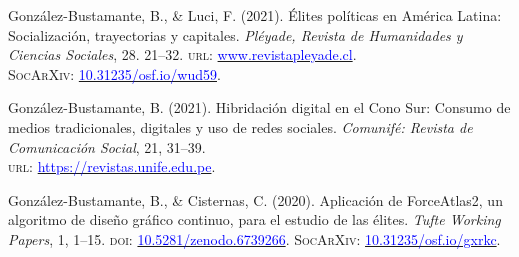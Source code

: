 \begin{publications}
\begin{benumerate}{14}
\item{González-Bustamante, B., \& Luci, F. (2021). Élites políticas en América Latina: Socialización, trayectorias y capitales. {\itshape Pléyade, Revista de Humanidades y Ciencias Sociales}, 28. 21--32. {\scshape url:} \href{http://www.revistapleyade.cl/index.php/OJS/article/view/359}{\textcolor{blue}{www.revistapleyade.cl}}. \\ {\scshape \footnotesize SocArXiv:} \href{https://doi.org/10.31235/osf.io/wud59}{\textcolor{blue}{10.31235/osf.io/wud59}}.}\vspace{1mm}


\item{González-Bustamante, B. (2021).  Hibridación digital en el Cono Sur: Consumo de medios tradicionales, digitales y uso de redes sociales. {\itshape Comunifé: Revista de Comunicación Social}, 21, 31--39. \\ {\scshape url:} \href{https://revistas.unife.edu.pe/index.php/comunife/article/view/2580/}{\textcolor{blue}{https://revistas.unife.edu.pe}}.}\vspace{1mm}


\item{González-Bustamante, B., \& Cisternas, C. (2020). Aplicación de ForceAtlas2, un algoritmo de diseño gráfico continuo, para el estudio de las élites. {\itshape Tufte Working Papers}, 1, 1--15. {\scshape doi:} \href{https://doi.org/10.5281/zenodo.6739266}{\textcolor{blue}{10.5281/zenodo.6739266}}. {\scshape \footnotesize SocArXiv:} \href{https://doi.org/10.31235/osf.io/gxrkc}{\textcolor{blue}{10.31235/osf.io/gxrkc}}.}\vspace{1mm}


\end{benumerate}
\end{publications}
